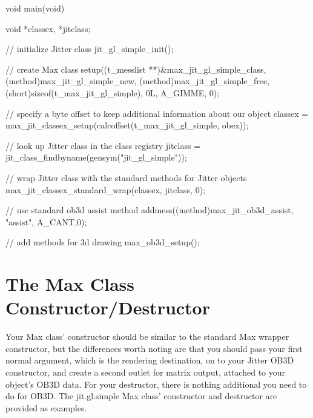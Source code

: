 \begin{DoxyCode}
void main(void)
{   
   void *classex, *jitclass;
   
   // initialize Jitter class
   jit_gl_simple_init();   
   
   // create Max class
   setup((t_messlist **)&max_jit_gl_simple_class, 
      (method)max_jit_gl_simple_new, (method)max_jit_gl_simple_free, 
      (short)sizeof(t_max_jit_gl_simple), 0L, A_GIMME, 0);

   // specify a byte offset to keep additional information about our object
   classex = max_jit_classex_setup(calcoffset(t_max_jit_gl_simple, obex));

   // look up Jitter class in the class registry
   jitclass = jit_class_findbyname(gensym("jit_gl_simple"));   
   
   // wrap Jitter class with the standard methods for Jitter objects
   max_jit_classex_standard_wrap(classex, jitclass, 0);    
                
      // use standard ob3d assist method
   addmess((method)max_jit_ob3d_assist, "assist", A_CANT,0);  

   // add methods for 3d drawing
   max_ob3d_setup();
}
\end{DoxyCode}
\hypertarget{chapter_jit_ob3dqs_chapter_jit_ob3dqs_wrapctor}{}\section{The Max Class Constructor/Destructor}\label{chapter_jit_ob3dqs_chapter_jit_ob3dqs_wrapctor}
Your Max class' constructor should be similar to the standard Max wrapper constructor, but the differences worth noting are that you should pass your first normal argument, which is the rendering destination, on to your Jitter OB3D constructor, and create a second outlet for matrix output, attached to your object's OB3D data. For your destructor, there is nothing additional you need to do for OB3D. The jit.gl.simple Max class' constructor and destructor are provided as examples.


